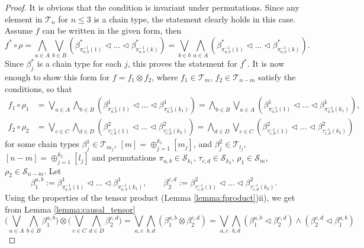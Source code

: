 \documentclass[12pt]{article}
\theoremstyle{definition}
\theoremstyle{remark}
\def\Te{\mathcal T}
\def\Fe{\mathcal F}
\def\permut{\mathscr{S}}
\def\vtl{\vartriangleleft}
\begin{document}
\begin{proof} It is obvious that the condition is invariant under permutations. Since any element in $\Te_n$ for $n\le 3$ is a chain type, the statement clearly holds in
this case. 
Assume $f$ can be written in the given form, then
\[
f^*\circ\rho =\bigwedge _{a\in A}\bigvee_{b\in B} (\beta^*_{\pi^{-1}_{a,b}(1)}\vtl \dots \vtl
\beta^*_{\pi^{-1}_{a,b}(k)})=\bigvee_{b\in b}\bigwedge_{a\in A} (\beta^*_{\pi^{-1}_{a,b}(1)}\vtl \dots \vtl
\beta^*_{\pi^{-1}_{a,b}(k)}).
\]
Since $\beta_j^*$ is a chain type for each $j$, this proves the statement for $f^*$. 
%
%
 It is now enough to show this form for  $f=f_1\otimes f_2$, where 
$f_1\in \Te_m$, $f_2\in \Te_{n-m}$ satisfy the conditions, so that
\begin{align*}
f_1\circ \rho_1 &=\bigvee_{a\in A}\bigwedge_{b\in B} (\beta^1_{\pi^{-1}_{a,b}(1)}\vtl \dots \vtl
\beta^1_{\pi^{-1}_{a,b}(k_1)})=\bigwedge_{b\in B}\bigvee_{a\in A} (\beta^1_{\pi^{-1}_{a,b}(1)}\vtl \dots \vtl
\beta^1_{\pi^{-1}_{a,b}(k_1)}),\\
f_2\circ\rho_2&=\bigvee_{c\in C}\bigwedge_{d\in D} (\beta^2_{\tau^{-1}_{c,d}(1)}\vtl \dots \vtl
\beta^2_{\tau^{-1}_{c,d}(k_2)})=\bigwedge_{d\in D} \bigvee_{c\in C}(\beta^2_{\tau^{-1}_{c,d}(1)}\vtl \dots \vtl
\beta^2_{\tau^{-1}_{c,d}(k_2)})
\end{align*}
for some chain types  $\beta^1_j\in \Te_{m_j}$, $[m]=\oplus^{k_1}_{j=1}[m_j]$, and $\beta^2_j\in \Te_{l_j}$,
$[n-m]=\oplus_{j=1}^{k_2}[l_j]$ and permutations $\pi_{a,b}\in \permut_{k_1}$, $\tau_{c,d}\in
\permut_{k_2}$, $\rho_1\in \permut_m$, $\rho_2\in \permut_{n-m}$.
Let 
\[
\beta^{a,b}_1:=\beta^1_{\pi^{-1}_{a,b}(1)}\vtl \dots \vtl
\beta^1_{\pi^{-1}_{a,b}(k_1)},\qquad \beta^{c,d}_2:= \beta^2_{\tau^{-1}_{c,d}(1)}\vtl \dots \vtl
\beta^2_{\tau^{-1}_{c,d}(k_2)}.
\]
Using the   properties of the tensor product (Lemma \ref{lemma:fproduct})ii), we get from
Lemma \ref{lemma:causal_tensor}
\[
\bigl(\bigvee_{a\in A}\bigwedge_{b\in B}\beta_1^{a,b}\bigr)\otimes \bigl(\bigvee_{c\in
C}\bigwedge_{d\in D}\beta_2^{c,d}\bigr)=\bigvee_{a,c}\bigwedge_{b,d}
(\beta_1^{a,b}\otimes \beta_2^{c,d})=\bigvee_{a,c}\bigwedge_{b,d}(\beta_1^{a,b}\vtl
\beta_2^{c,d})\wedge (\beta_2^{c,d}\vtl \beta_1^{a,b})
\]
\end{proof}
\end{document}
